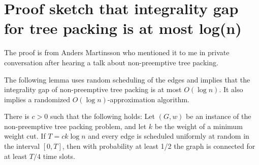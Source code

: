 \documentclass[runningheads]{llncs}
\numberwithin{equation}{section}
\begin{document}
\section{Proof sketch that integrality gap for tree packing is at most log(n)}
The proof is from Anders Martinsson who mentioned it to me in private conversation after hearing a talk about non-preemptive tree packing.

The following lemma uses random scheduling of the edges and implies that the integrality gap of non-preemptive tree packing is at most $O(\log n)$. It also implies a randomized $O(\log n)$-approximation algorithm.

\begin{lemma}
There is $c > 0$ such that the following holds: Let $(G, w)$ be an instance of the non-preemptive tree packing problem, and let $k$ be the weight of a minimum weight cut. If $T = ck\log n$ and every edge is scheduled uniformly at random in the interval $[0, T]$, then with probability at least 1/2 the graph is connected for at least $T/4$ time slots.
\end{lemma}
\end{document}
